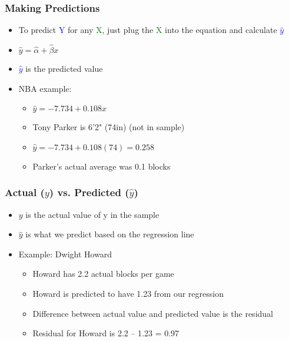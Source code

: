 \documentclass[handout]{beamer}
\newcommand{\blue}{\textcolor{blue}}
\newcommand{\green}{\textcolor{green}}
\begin{document}
\begin{frame}
 \frametitle{Making Predictions}
 \begin{minipage}{.58\linewidth}
 \begin{itemize}[<+->]
   \item To predict \blue{Y} for any \green{X}, just plug the \green{X} into the equation and calculate \blue{$\hat{y}$}
   \item $\hat{y} = \hat{\alpha} +  \hat{\beta} x$
   \item \blue{$\hat{y}$} is the \alert{predicted value}
   \item NBA example:
     \begin{itemize}
       \item $\hat{y} = -7.734 + 0.108 x$
       \item Tony Parker is 6'2" (74in) (not in sample)
       \item $\hat{y} = -7.734 + 0.108 (74) = 0.258$
       \item Parker's \alert{actual} average was 0.1 blocks
     \end{itemize}
 \end{itemize}
 \end{minipage}\hfill
 \begin{minipage}{.38\linewidth}
 \end{minipage}
\end{frame}

\begin{frame}
 \frametitle<+->{Actual ($y$) vs. Predicted ($\hat{y}$)}
 \begin{minipage}{.52\linewidth}
 \end{minipage}\hfill
 \begin{minipage}{.48\linewidth}
 \begin{itemize}[<+->]
   \item $y$ is the actual value of y in the sample
   \item $\hat{y}$ is what we predict based on the regression line
   \item Example: Dwight Howard
     \begin{itemize}
       \item Howard has 2.2 \alert{actual} blocks per game
       \item Howard is \alert{predicted} to have 1.23 from our regression
       \item Difference between actual value and predicted value is the \alert{residual}
       \item Residual for Howard is 2.2 – 1.23 = 0.97
     \end{itemize}
 \end{itemize}
 \end{minipage}
\end{frame}
\end{document}
